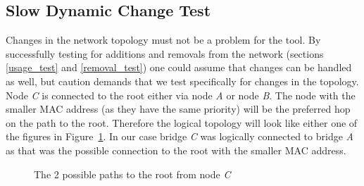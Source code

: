 \subsection{Slow Dynamic Change Test}
\label{slow_dynamic_test}
Changes in the network topology must not be a problem for the tool.
By successfully testing for additions and removals from the network (sections \ref{usage_test} and \ref{removal_test}) one could assume that changes can be handled as well, but caution demands that we test specifically for changes in the topology.
Node \textit{C} is connected to the root either via node \textit{A} or node \textit{B}.
The node with the smaller MAC address (as they have the same priority) will be the preferred hop on the path to the root.
Therefore the logical topology will look like either one of the figures in Figure~\ref{fig:possible_topologies}.
In our case bridge \textit{C} was logically connected to bridge \textit{A} as that was the possible connection to the root with the smaller MAC address.

\begin{figure}[hp]
    \centering
    \hspace{1cm}
    \caption{The 2 possible paths to the root from node \textit{C}}
    \label{fig:possible_topologies}
\end{figure}

